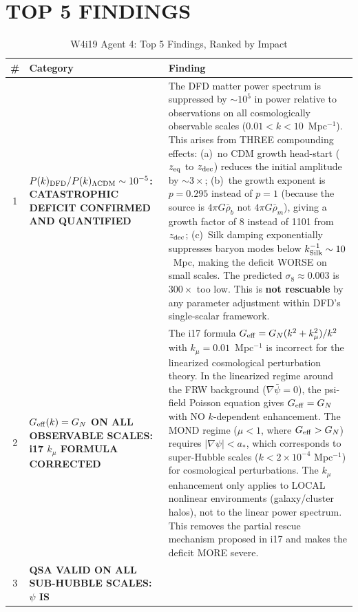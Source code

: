 \documentclass[aps,prd,twocolumn,nofootinbib]{revtex4-2}
\newcommand{\astar}{a_*}
\newcommand{\ee}[1]{\times 10^{#1}}
\newcommand{\Geff}{G_{\rm eff}}
\newcommand{\kmu}{k_\mu}
\begin{document}
\section*{TOP 5 FINDINGS}
\label{sec:findings}

\begin{table}[t]
\centering
\caption{W4i19 Agent 4: Top 5 Findings, Ranked by Impact}
\begin{tabular}{@{}clp{11cm}@{}}
\toprule
\# & Category & Finding \\
\midrule
1 & \textbf{$P(k)_{\rm DFD}/P(k)_{\rm \Lambda CDM} \sim 10^{-5}$:
  CATASTROPHIC DEFICIT CONFIRMED AND QUANTIFIED} &
  The DFD matter power spectrum is suppressed by $\sim 10^5$ in power
  relative to observations on all cosmologically observable scales
  ($0.01 < k < 10$~Mpc$^{-1}$). This arises from THREE compounding
  effects: (a)~no CDM growth head-start ($z_{\rm eq}$ to $z_{\rm dec}$)
  reduces the initial amplitude by $\sim 3\times$;
  (b)~the growth exponent is $p = 0.295$ instead of $p = 1$
  (because the source is $4\pi G\bar\rho_b$ not $4\pi G\bar\rho_m$),
  giving a growth factor of 8 instead of 1101 from $z_{\rm dec}$;
  (c)~Silk damping exponentially suppresses baryon modes below
  $k_{\rm Silk}^{-1} \sim 10$~Mpc, making the deficit WORSE on
  small scales. The predicted $\sigma_8 \approx 0.003$ is $300\times$
  too low. This is \textbf{not rescuable} by any parameter adjustment
  within DFD's single-scalar framework. \\
\midrule
2 & \textbf{$\Geff(k) = G_N$ ON ALL OBSERVABLE SCALES: i17 $\kmu$
  FORMULA CORRECTED} &
  The i17 formula $\Geff = G_N(k^2 + \kmu^2)/k^2$ with $\kmu =
  0.01$~Mpc$^{-1}$ is incorrect for the linearized cosmological
  perturbation theory. In the linearized regime around the FRW
  background ($\nabla\bar\psi = 0$), the psi-field Poisson equation
  gives $\Geff = G_N$ with NO $k$-dependent enhancement. The MOND
  regime ($\mu < 1$, where $\Geff > G_N$) requires $|\nabla\psi|
  < \astar$, which corresponds to super-Hubble scales ($k < 2\ee{-4}$
  Mpc$^{-1}$) for cosmological perturbations. The $\kmu$ enhancement
  only applies to LOCAL nonlinear environments (galaxy/cluster halos),
  not to the linear power spectrum. This removes the partial rescue
  mechanism proposed in i17 and makes the deficit MORE severe. \\
\midrule
3 & \textbf{QSA VALID ON ALL SUB-HUBBLE SCALES: $\psi$ IS
}
\end{tabular}
\end{table}
\end{document}
